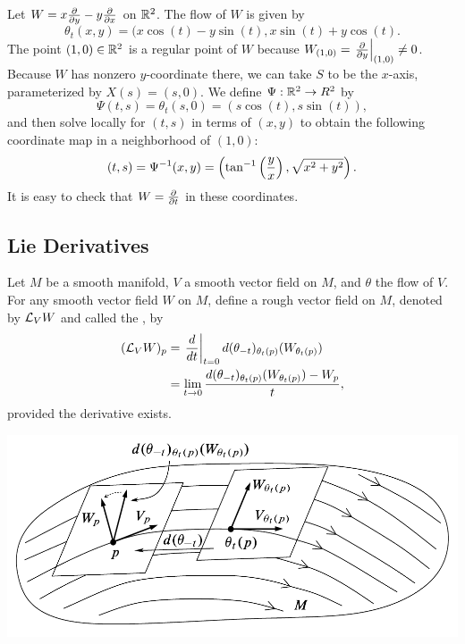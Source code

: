 \begin{ex}
Let $W = x\frac{\partial}{\partial y} - y\frac{\partial}{\partial x}$ on $\mathbb{R}^2$. The flow of $W$ is given by 
\[\theta_t(x,y) = (x\cos(t) - y\sin(t), x\sin(t) + y\cos(t).\]
The point $(1,0)\in \mathbb{R}^2$ is a regular point of $W$ because $W_{(1,0)} = \left. \frac{\partial}{\partial y}\right|_{(1,0)}\neq 0$. Because $W$ has nonzero $y$-coordinate there, we can take $S$ to be the $x$-axis, parameterized by $X(s) = (s,0)$. We define $\Psi:\mathbb{R}^2\rightarrow R^2$ by 
\[\Psi(t,s) = \theta_t(s,0) = (s\cos(t), s\sin(t)),\]
and then solve locally for $(t,s)$ in terms of $(x,y)$ to obtain the following coordinate map in a neighborhood of $(1,0)$:
\[(t,s) = \Psi^{-1}(x,y) =\left( \tan^{-1}\left(\frac{y}{x}\right),\sqrt{x^2 + y^2}\right).\]
It is easy to check that $W = \frac{\partial}{\partial t}$ in these coordinates.
\end{ex}



\subsection{Lie Derivatives}\nl

\dfn Let $M$ be a smooth manifold, $V$ a smooth vector field on $M$, and $\theta$ the flow of $V$. For any smooth vector field $W$ on $M$, define a rough vector field on $M$, denoted by $\mathcal{L}_V W$ and called the , by 
\begin{align*}
    (\mathcal{L}_V W)_p &= \left. \frac{d}{dt}\right|_{t = 0}d(\theta_{-t})_{\theta_t(p)}(W_{\theta_t(p)})\\
    &=\lim_{t\rightarrow 0} \frac{d(\theta_{-t})_{\theta_t(p)}(W_{\theta_t(p)}) - W_p}{t},
\end{align*}
provided the derivative exists.

\begin{center}
    \includegraphics[scale = 0.38]{chapter09/c9f13.png}
\end{center}

\setcounter{thm}{35}

